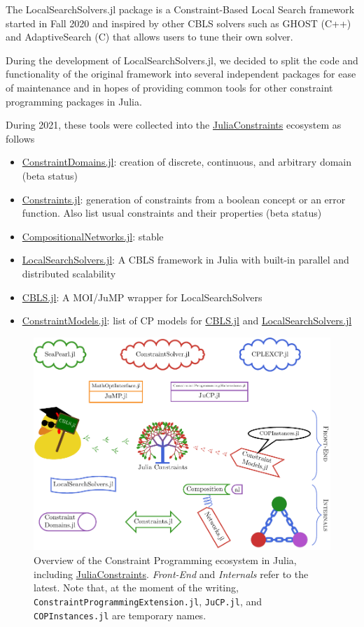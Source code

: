 \documentclass{juliacon}
\newcommand{\jc}{\href{https://github.com/JuliaConstraints}{JuliaConstraints}\xspace}
\newcommand{\cdjl}{\href{https://github.com/JuliaConstraints/ConstraintDomains.jl}{ConstraintDomains.jl}\xspace}
\newcommand{\cnjl}{\href{https://github.com/JuliaConstraints/CompositionalNetworks.jl}{CompositionalNetworks.jl}\xspace}
\newcommand{\cjl}{\href{https://github.com/JuliaConstraints/Constraints.jl}{Constraints.jl}\xspace}
\newcommand{\cmjl}{\href{https://github.com/JuliaConstraints/ConstraintModels.jl}{ConstraintModels.jl}\xspace}
\newcommand{\lssjl}{\href{https://github.com/JuliaConstraints/LocalSearchSolvers.jl}{LocalSearchSolvers.jl}\xspace}
\newcommand{\cblsjl}{\href{https://github.com/JuliaConstraints/CBLS.jl}{CBLS.jl}\xspace}
\begin{document}
The LocalSearchSolvers.jl package is a Constraint-Based Local Search framework started in Fall 2020 and inspired by other CBLS solvers such as GHOST (C++) and AdaptiveSearch (C) that allows users to tune their own solver.

During the development of LocalSearchSolvers.jl, we decided to split the code and functionality of the original framework into several independent packages for ease of maintenance and in hopes of providing common tools for other constraint programming packages in Julia.

During 2021, these tools were collected into the \jc ecosystem as follows
\begin{itemize}
  \item \cdjl: creation of discrete, continuous, and arbitrary domain (beta status)
  \item \cjl: generation of constraints from a boolean concept or an error function. Also list usual constraints and their properties (beta status)
  \item \cnjl: stable
  \item \lssjl: A CBLS framework in Julia with built-in parallel and distributed scalability
  \item \cblsjl: A MOI/JuMP wrapper for LocalSearchSolvers
  \item \cmjl: list of CP models for \cblsjl and \lssjl
\end{itemize}

\begin{figure}[t]
  \centerline{\includegraphics[page=1, width=.9\textwidth]{figs/overview.pdf}}
  \caption{Overview of the Constraint Programming ecosystem in Julia, including \jc. \emph{Front-End} and \emph{Internals} refer to the latest. Note that, at the moment of the writing, \texttt{ConstraintProgrammingExtension.jl}, \texttt{JuCP.jl}, and \texttt{COPInstances.jl} are temporary names.}
  \label{fig:overview}
\end{figure}
\end{document}
